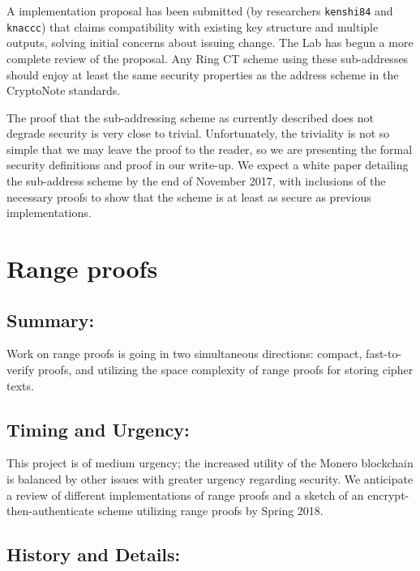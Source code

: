 \documentclass[12pt,english]{mrl}
\theoremstyle{definition}
\numberwithin{equation}{section}
\numberwithin{figure}{section}
\numberwithin{equation}{section}
\numberwithin{equation}{section}
\numberwithin{figure}{section}
\begin{document}
A implementation proposal has been submitted (by researchers \texttt{kenshi84} and \texttt{knaccc}) that claims compatibility with existing key structure and multiple outputs, solving initial concerns about issuing change. The Lab has begun a more complete review of the proposal. Any Ring CT scheme using these sub-addresses should enjoy at least the same security properties as the address scheme in the CryptoNote standards. 

The proof that the sub-addressing scheme as currently described does not degrade security is very close to trivial. Unfortunately, the triviality is not so simple that we may leave the proof to the reader, so we are presenting the formal security definitions and proof in our write-up. We expect a white paper detailing the sub-address scheme by the end of November 2017, with inclusions of the necessary proofs to show that the scheme is at least as secure as previous implementations.





\section{Range proofs} 

\subsection{Summary:} 

Work on range proofs is going in two simultaneous directions: compact, fast-to-verify proofs, and utilizing the space complexity of range proofs for storing cipher texts.

\subsection{Timing and Urgency:} 

This project is of medium urgency; the increased utility of the Monero blockchain is balanced by other issues with greater urgency regarding security. We anticipate a review of different implementations of range proofs and a sketch of an encrypt-then-authenticate scheme utilizing range proofs by Spring 2018.

\subsection{History and Details:} 
\end{document}

